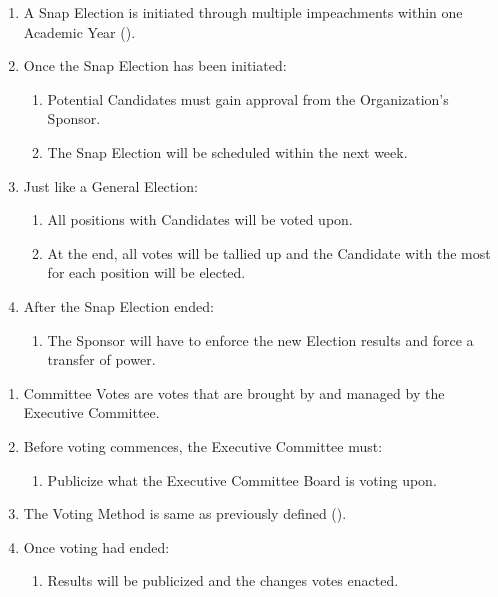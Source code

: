 \begin{enumerate}
	\item A Snap Election is initiated through multiple impeachments within one Academic
		Year ().

	\item Once the Snap Election has been initiated:
		\begin{enumerate}
			\item Potential Candidates must gain approval from the Organization's Sponsor.

			\item The Snap Election will be scheduled within the next week.
		\end{enumerate}

	\item Just like a General Election:
		\begin{enumerate}
			\item All positions with Candidates will be voted upon.

			\item At the end, all votes will be tallied up and the Candidate with the
				most for each position will be elected.
		\end{enumerate}

	\item After the Snap Election ended:
		\begin{enumerate}
			\item The Sponsor will have to enforce the new Election results and force a
				transfer of power.
		\end{enumerate}
\end{enumerate}

\begin{enumerate}
	\item Committee Votes are votes that are brought by and managed by the Executive
		Committee.

	\item Before voting commences, the Executive Committee must:
		\begin{enumerate}
			\item Publicize what the Executive Committee Board is voting upon.
		\end{enumerate}

	\item The Voting Method is same as previously defined ().

	\item Once voting had ended:
		\begin{enumerate}
			\item Results will be publicized and the changes votes enacted.
		\end{enumerate}
\end{enumerate}